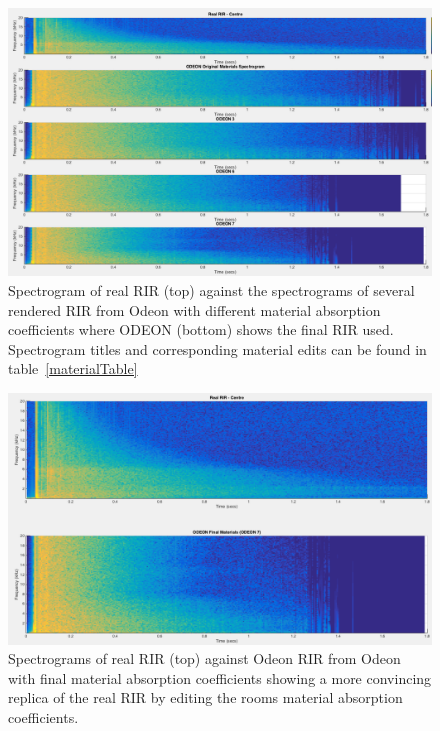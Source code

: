 \documentclass[../../main.tex]{subfiles}
\begin{document}
			\begin{figure}
				\centerline{\includegraphics[width=\textwidth]{Sections/Implementation/Odeon/images/MaterialCompare/OriginalMaterials/all.png}}
				\caption{Spectrogram of real \ac{RIR} (top) against the spectrograms of several rendered \ac{RIR} from Odeon with different material absorption coefficients where ODEON (bottom) shows the final \ac{RIR} used. Spectrogram titles and corresponding material edits can be found in table~\ref{materialTable}}
				\label{compareAll}
			\end{figure}

			\begin{figure}
				\centerline{\includegraphics[width=\textwidth]{Sections/Implementation/Odeon/images/MaterialCompare/OriginalMaterials/new.png}}
				\caption{Spectrograms of real \ac{RIR} (top) against Odeon \ac{RIR} from Odeon with final material absorption coefficients showing a more convincing replica of the real \ac{RIR} by editing the rooms material absorption coefficients.}
				\label{compareNew}
			\end{figure}
\end{document}
